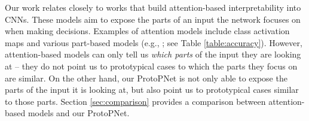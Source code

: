 \documentclass{article}
\theoremstyle{definition}
\theoremstyle{remark}
\begin{document}
Our work relates closely to works that build attention-based interpretability into CNNs. These models aim to expose the parts of an input the network focuses on when making decisions.
Examples of attention models include class activation maps \cite{zhou2016learning} and various part-based models (e.g., \cite{zheng2017learning,zhang2014part,huang2016part,zhou2018interpretable,uijlings2013selective,girshick2014rich,girshick2015fast,ren2015faster,simon2015neural,xiao2015application,fu2017look}; see Table \ref{table:accuracy}).
However, attention-based models can only tell us \textit{which parts} of the input they are looking at -- they do not point us to prototypical cases to which the parts they focus on are similar. On the other hand, our ProtoPNet is not only able to expose the parts of the input it is looking at, but also point us to prototypical cases similar to those parts. Section \ref{sec:comparison} provides a comparison between attention-based models and our ProtoPNet.
\end{document}
